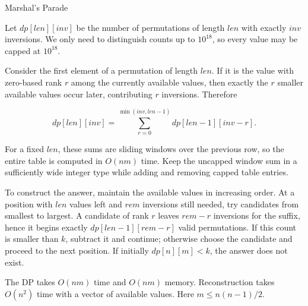 \begin{tutorial}{Marshal's Parade}

Let $dp[len][inv]$ be the number of permutations of length $len$ with exactly $inv$ inversions. We only need to distinguish counts up to $10^{18}$, so every value may be capped at $10^{18}$.

Consider the first element of a permutation of length $len$. If it is the value with zero-based rank $r$ among the currently available values, then exactly the $r$ smaller available values occur later, contributing $r$ inversions. Therefore

$$dp[len][inv] = \sum_{r=0}^{\min(inv,len-1)} dp[len-1][inv-r].$$

For a fixed $len$, these sums are sliding windows over the previous row, so the entire table is computed in $O(nm)$ time. Keep the uncapped window sum in a sufficiently wide integer type while adding and removing capped table entries.

To construct the answer, maintain the available values in increasing order. At a position with $len$ values left and $rem$ inversions still needed, try candidates from smallest to largest. A candidate of rank $r$ leaves $rem-r$ inversions for the suffix, hence it begins exactly $dp[len-1][rem-r]$ valid permutations. If this count is smaller than $k$, subtract it and continue; otherwise choose the candidate and proceed to the next position. If initially $dp[n][m] < k$, the answer does not exist.

The DP takes $O(nm)$ time and $O(nm)$ memory. Reconstruction takes $O(n^2)$ time with a vector of available values. Here $m \le n(n-1)/2$.


\end{tutorial}
